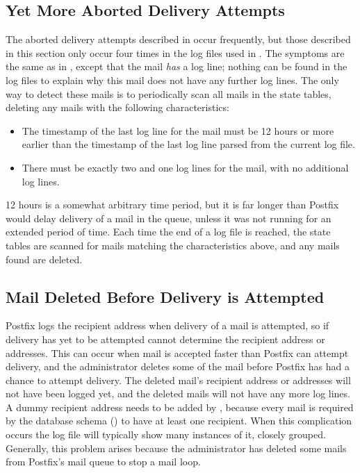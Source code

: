 \subsection{Yet More Aborted Delivery Attempts}

\label{yet more aborted delivery attempts}

The aborted delivery attempts described in  occur frequently, but those described in this section only occur
four times in the \numberOFlogFILES{} log files used in
.  The symptoms are the same as in
, except that the mail \textit{has\/}
a  log line; nothing can be found in the log files to
explain why this mail does not have any further log lines.  The only way to
detect these mails is to periodically scan all mails in the state tables,
deleting any mails with the following characteristics:

\begin{itemize}

    \item The timestamp of the last log line for the mail must be 12 hours
        or more earlier than the timestamp of the last log line parsed from
        the current log file.

    \item There must be exactly two  and one 
        log lines for the mail, with no additional log lines.

\end{itemize}

12 hours is a somewhat arbitrary time period, but it is far longer than
Postfix would delay delivery of a mail in the queue, unless it was not
running for an extended period of time.  Each time the end of a log file is
reached, the state tables are scanned for mails matching the
characteristics above, and any mails found are deleted.

\subsection{Mail Deleted Before Delivery is Attempted}

\label{Mail deleted before delivery is attempted}

Postfix logs the recipient address when delivery of a mail is attempted, so
if delivery has yet to be attempted \parsername{} cannot determine the
recipient address or addresses.  This can occur when mail is accepted
faster than Postfix can attempt delivery, and the administrator deletes
some of the mail before Postfix has had a chance to attempt delivery.  The
deleted mail's recipient address or addresses will not have been logged
yet, and the deleted mails will not have any more log lines.  A dummy
recipient address needs to be added by \parsername{}, because every mail is
required by the database schema () to have at
least one recipient.  When this complication occurs the log file will
typically show many instances of it, closely grouped.  Generally, this
problem arises because the administrator has deleted some mails from
Postfix's mail queue to stop a mail loop.

